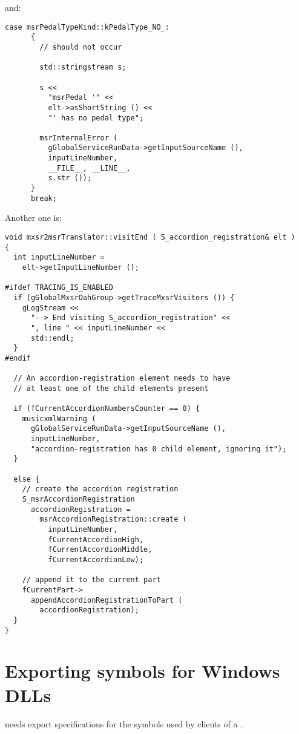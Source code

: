 and:
\begin{lstlisting}[language=CPlusPlus]
    case msrPedalTypeKind::kPedalType_NO_:
      {
        // should not occur

        std::stringstream s;

        s <<
          "msrPedal '" <<
          elt->asShortString () <<
          "' has no pedal type";

        msrInternalError (
          gGlobalServiceRunData->getInputSourceName (),
          inputLineNumber,
          __FILE__, __LINE__,
          s.str ());
      }
      break;
\end{lstlisting}

Another one is:
\begin{lstlisting}[language=CPlusPlus]
void mxsr2msrTranslator::visitEnd ( S_accordion_registration& elt )
{
  int inputLineNumber =
    elt->getInputLineNumber ();

#ifdef TRACING_IS_ENABLED
  if (gGlobalMxsrOahGroup->getTraceMxsrVisitors ()) {
    gLogStream <<
      "--> End visiting S_accordion_registration" <<
      ", line " << inputLineNumber <<
      std::endl;
  }
#endif

  // An accordion-registration element needs to have
  // at least one of the child elements present

  if (fCurrentAccordionNumbersCounter == 0) {
    musicxmlWarning (
      gGlobalServiceRunData->getInputSourceName (),
      inputLineNumber,
      "accordion-registration has 0 child element, ignoring it");
  }

  else {
    // create the accordion registration
    S_msrAccordionRegistration
      accordionRegistration =
        msrAccordionRegistration::create (
          inputLineNumber,
          fCurrentAccordionHigh,
          fCurrentAccordionMiddle,
          fCurrentAccordionLow);

    // append it to the current part
    fCurrentPart->
      appendAccordionRegistrationToPart (
        accordionRegistration);
  }
}
\end{lstlisting}


\section{Exporting symbols for Windows DLLs}

 needs export specifications for the symbols used by clients of a .

